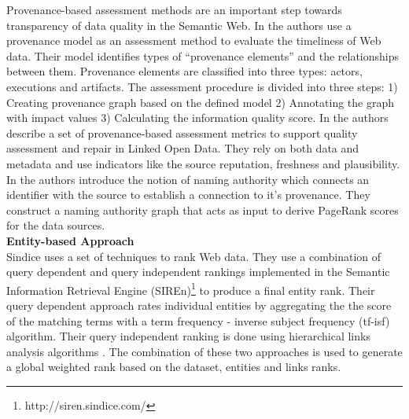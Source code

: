 \documentclass[onecolumn, crcready]{iosart2c}
\begin{document}
Provenance-based assessment methods are an important step towards transparency of data quality in the Semantic Web. In \cite{Hartig09usingweb} the authors use a provenance model as an assessment method to evaluate the timeliness of Web data. Their model identifies types of ``provenance elements'' and the relationships between them. Provenance elements are classified into three types: actors, executions and artifacts. The assessment procedure is divided into three steps: 1) Creating provenance graph based on the defined model 2) Annotating the graph with impact values 3) Calculating the information quality score. In \cite{Flouris2012} the authors describe a set of provenance-based assessment metrics to support quality assessment and repair in Linked Open Data. They rely on both data and metadata and use indicators like the source reputation, freshness and plausibility. In \cite{Harth2009} the authors introduce the notion of naming authority which connects an identifier with the source to establish a connection to it's provenance. They construct a naming authority graph that acts as input to derive PageRank scores for the data sources.\\

{\bf Entity-based Approach}\\

Sindice \cite{Delbru2010} uses a set of techniques to rank Web data. They use a combination of query dependent and query independent rankings implemented in the Semantic Information Retrieval Engine (SIREn)\footnote{http://siren.sindice.com/} to produce a final entity rank. Their query dependent approach rates individual entities by aggregating the the score of the matching terms with a term frequency - inverse subject frequency (tf-isf) algorithm. Their query independent ranking is done using hierarchical links analysis algorithms \cite{Delbru2010a}. The combination of these two approaches is used to generate a global weighted rank based on the dataset, entities and links ranks. \\
\end{document}
